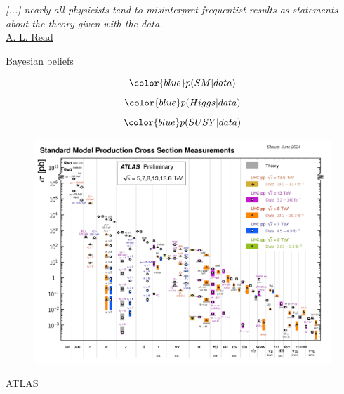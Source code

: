 \documentclass[
aspectratio=169,
14pt,
professionalfonts
]{beamer}
\begin{document}
\begin{frame}
    \textit{ [...] nearly all physicists tend to misinterpret frequentist results as statements about the theory given with the data.}\\
    \flushright \href{https://indico.cern.ch/event/398949/attachments/799330/1095613/The_CLs_Technique.pdf}{A. L. Read}
\end{frame}

\begin{frame}{Bayesian beliefs}
    \begin{minipage}{0.44\textwidth}
        $$\color{blue} p(SM|data)$$
        $$\color{blue} p(Higgs|data)$$
        $$\color{blue} p(SUSY|data)$$
    \end{minipage}
    \begin{minipage}{0.55\textwidth}
        \begin{figure}
            \centering
            \includegraphics[width=\textwidth]{../plots/sm_pred.png}
        \end{figure}
        \small \flushright
        \href{https://atlas.web.cern.ch/Atlas/GROUPS/PHYSICS/PUBNOTES/ATL-PHYS-PUB-2024-011/fig_03a.png}{ATLAS}
    \end{minipage}
\end{frame}
\end{document}
